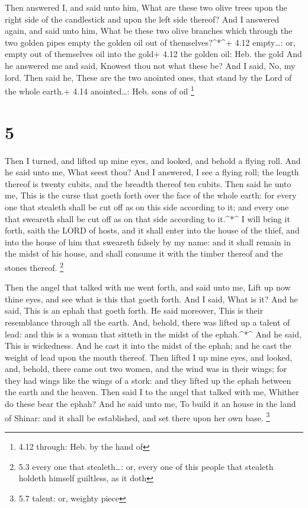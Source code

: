  Then answered I, and said unto him, What are these two
olive trees upon the right side of the candlestick and upon the left
side thereof?  And I answered again, and said unto him,
What be these two olive branches which through the two golden pipes
empty the golden oil out of themselves?\^{}*\^{}+ 4.12 empty\ldots: or,
empty out of themselves oil into the gold+ 4.12 the golden oil: Heb. the
gold  And he answered me and said, Knowest thou not what
these be? And I said, No, my lord.  Then said he, These are
the two anointed ones, that stand by the Lord of the whole earth.+ 4.14
anointed\ldots: Heb. sons of oil \footnote{4.12 through: Heb. by the
  hand of}

\hypertarget{section-4}{%
\section{5}\label{section-4}}

 Then I turned, and lifted up mine eyes, and looked, and
behold a flying roll.  And he said unto me, What seest thou?
And I answered, I see a flying roll; the length thereof is twenty
cubits, and the breadth thereof ten cubits.  Then said he
unto me, This is the curse that goeth forth over the face of the whole
earth: for every one that stealeth shall be cut off as on this side
according to it; and every one that sweareth shall be cut off as on that
side according to it.\^{}*\^{}  I will bring it forth, saith
the LORD of hosts, and it shall enter into the house of the thief, and
into the house of him that sweareth falsely by my name: and it shall
remain in the midst of his house, and shall consume it with the timber
thereof and the stones thereof. \footnote{5.3 every one that
  stealeth\ldots: or, every one of this people that stealeth holdeth
  himself guiltless, as it doth}

 Then the angel that talked with me went forth, and said
unto me, Lift up now thine eyes, and see what is this that goeth forth.
 And I said, What is it? And he said, This is an ephah that
goeth forth. He said moreover, This is their resemblance through all the
earth.  And, behold, there was lifted up a talent of lead:
and this is a woman that sitteth in the midst of the ephah.\^{}*\^{}
 And he said, This is wickedness. And he cast it into the
midst of the ephah; and he cast the weight of lead upon the mouth
thereof.  Then lifted I up mine eyes, and looked, and,
behold, there came out two women, and the wind was in their wings; for
they had wings like the wings of a stork: and they lifted up the ephah
between the earth and the heaven.  Then said I to the angel
that talked with me, Whither do these bear the ephah?  And
he said unto me, To build it an house in the land of Shinar: and it
shall be established, and set there upon her own base. \footnote{5.7
  talent: or, weighty piece}

